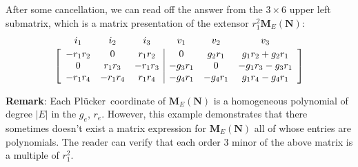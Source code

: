 \documentclass[12pt]{article}
\theoremstyle{definition}
\newcommand{\Remark}{\textbf{Remark}}
\newcommand{\Card}[1]{\ensuremath{{\left|#1\right|}}}
\newcommand{\ext}[1]{\ensuremath{\mathbf{#1}}}
\newcommand{\Plucker}{Pl\"{u}cker\ }
\begin{document}
After some cancellation, we can read off the answer from the $3\times 6$ upper left submatrix, which is a matrix presentation of the
extensor $r_1^2\ext{M}_E(\ext{N})$:
\[
\begin{array}{c}
\begin{array}{cccccc}
i_1 & i_2 & i_3 & v_1 & v_2 & v_3 \\[-1em]
\hphantom{-r_1r_4}&\hphantom{-r_1r_4}&\hphantom{-r_1r_4}&
\hphantom{-g_4r_1}&\hphantom{-g_4r_1}&\hphantom{-g_1r_3-g_3r_1}
\end{array}\\
\left[
\begin{array}{ccc|ccc}
-r_1r_2 & 0      &r_1r_2  &  0    &g_2r_1 &g_1r_2+g_2r_1     \\
0       &r_1r_3  &-r_1r_3 &-g_3r_1&  0    &-g_1r_3-g_3r_1   \\
-r_1r_4 &-r_1r_4 &r_1r_4  &-g_4r_1&-g_4r_1&g_1r_4-g_4r_1  
\end{array}\right]\end{array}
\]

\Remark:  Each
\Plucker coordinate of $\ext{M}_E(\ext{N})$ is a homogeneous polynomial
of degree
$\Card{E}$ in the $g_e$, $r_e$.  However, this example demonstrates
that there sometimes doesn't exist a matrix expression for 
$\ext{M}_E(\ext{N})$ all of whose entries are polynomials.  The reader can
verify that each order 3 minor of the above matrix is a multiple of
$r_1^2$.  
\end{document}
